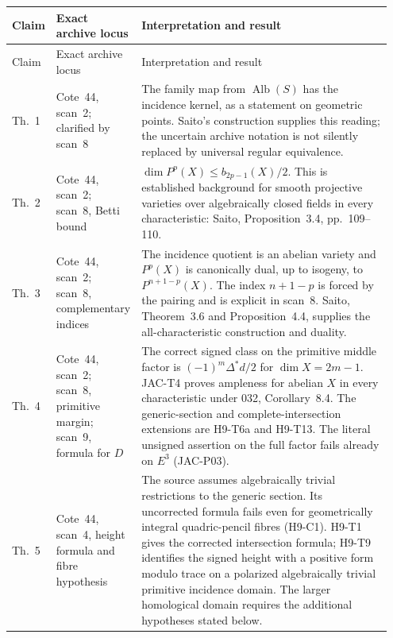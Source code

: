 \begingroup
\small
\setlength{\tabcolsep}{4pt}
\renewcommand{\arraystretch}{1.15}
\begin{longtable}{@{}p{0.08\linewidth}p{0.19\linewidth}p{0.68\linewidth}@{}}
\toprule
Claim & Exact archive locus & Interpretation and result\\
\midrule
\endfirsthead
\toprule
Claim & Exact archive locus & Interpretation and result\\
\midrule
\endhead
Th.~1 & Cote~44, scan~2; clarified by scan~8 &
The family map from $\operatorname{Alb}(S)$ has the incidence
kernel, as a statement on geometric points. Saito's construction
supplies this reading; the uncertain archive notation is not
silently replaced by universal regular equivalence.\\

Th.~2 & Cote~44, scan~2; scan~8, Betti bound &
$\dim P^p(X)\le b_{2p-1}(X)/2$. This is established background for
smooth projective varieties over algebraically closed fields in
every characteristic: Saito, Proposition~3.4, pp.~109--110.\\

Th.~3 & Cote~44, scan~2; scan~8, complementary indices &
The incidence quotient is an abelian variety and $P^p(X)$ is
canonically dual, up to isogeny, to $P^{n+1-p}(X)$.
The index $n+1-p$ is forced by the pairing and is explicit in
scan~8. Saito, Theorem~3.6 and Proposition~4.4, supplies the
all-characteristic construction and duality.\\

Th.~4 & Cote~44, scan~2; scan~8, primitive margin; scan~9, formula for $D$ &
The correct signed class on the primitive middle factor is
$(-1)^m\Delta^*d/2$ for $\dim X=2m-1$.
JAC-T4 proves ampleness for abelian $X$ in every characteristic
under 032, Corollary~8.4. The generic-section and complete-intersection
extensions are H9-T6a and H9-T13. The literal unsigned assertion
on the full factor fails already on $E^3$ (JAC-P03).\\

Th.~5 & Cote~44, scan~4, height formula and fibre hypothesis &
The source assumes algebraically trivial restrictions to the generic
section. Its uncorrected formula fails even for geometrically
integral quadric-pencil fibres (H9-C1). H9-T1 gives the corrected
intersection formula; H9-T9 identifies the signed height with a
positive form modulo trace on a polarized algebraically trivial
primitive incidence domain. The larger homological domain requires
the additional hypotheses stated below.\\


\end{longtable}
